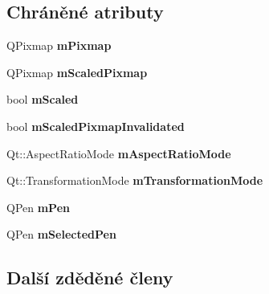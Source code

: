 \subsection*{Chráněné atributy}
\begin{DoxyCompactItemize}
\item 
\hypertarget{classQCPItemPixmap_a1396cce7f26c7b8e9512906284380c4d}{}Q\+Pixmap {\bfseries m\+Pixmap}\label{classQCPItemPixmap_a1396cce7f26c7b8e9512906284380c4d}

\item 
\hypertarget{classQCPItemPixmap_a2ebc66e15b9f1264563d58f29ba1bc00}{}Q\+Pixmap {\bfseries m\+Scaled\+Pixmap}\label{classQCPItemPixmap_a2ebc66e15b9f1264563d58f29ba1bc00}

\item 
\hypertarget{classQCPItemPixmap_a8fe670a529cd46a9b8afd9fc1203bc3f}{}bool {\bfseries m\+Scaled}\label{classQCPItemPixmap_a8fe670a529cd46a9b8afd9fc1203bc3f}

\item 
\hypertarget{classQCPItemPixmap_a223134abd4cf3d6c368573c622bd2e1c}{}bool {\bfseries m\+Scaled\+Pixmap\+Invalidated}\label{classQCPItemPixmap_a223134abd4cf3d6c368573c622bd2e1c}

\item 
\hypertarget{classQCPItemPixmap_a8dc6b6c1e106ac523efae22d5fe55bab}{}Qt\+::\+Aspect\+Ratio\+Mode {\bfseries m\+Aspect\+Ratio\+Mode}\label{classQCPItemPixmap_a8dc6b6c1e106ac523efae22d5fe55bab}

\item 
\hypertarget{classQCPItemPixmap_ac9ecad3b9842363754e32eda2cf821bd}{}Qt\+::\+Transformation\+Mode {\bfseries m\+Transformation\+Mode}\label{classQCPItemPixmap_ac9ecad3b9842363754e32eda2cf821bd}

\item 
\hypertarget{classQCPItemPixmap_acfee1124eb51a1887aaf8de10777c7a1}{}Q\+Pen {\bfseries m\+Pen}\label{classQCPItemPixmap_acfee1124eb51a1887aaf8de10777c7a1}

\item 
\hypertarget{classQCPItemPixmap_a0949e5bb6a261fc4e9668e28e2effcfa}{}Q\+Pen {\bfseries m\+Selected\+Pen}\label{classQCPItemPixmap_a0949e5bb6a261fc4e9668e28e2effcfa}

\end{DoxyCompactItemize}
\subsection*{Další zděděné členy}



